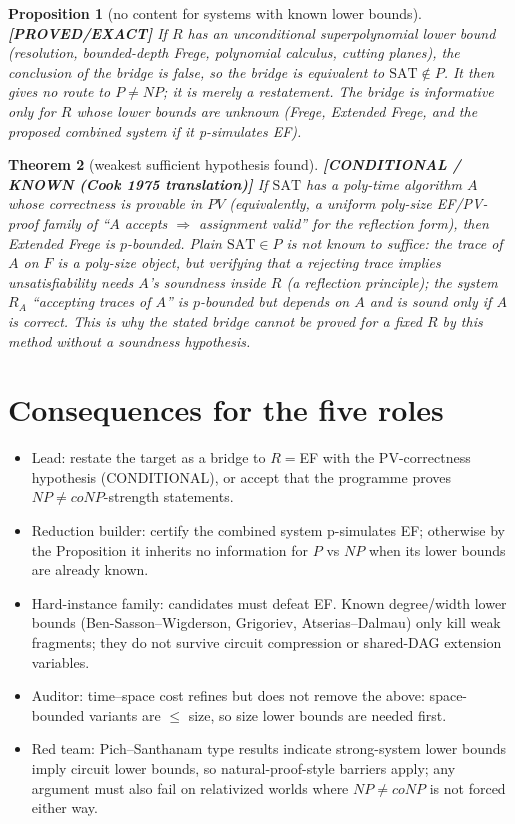 \documentclass[11pt]{article}
\newtheorem{theorem}{Theorem}
\newtheorem{proposition}[theorem]{Proposition}
\newcommand{\status}[1]{\textbf{[#1]}}
\newcommand{\SAT}{\mathrm{SAT}}
\begin{document}
\begin{proposition}[no content for systems with known lower bounds] \status{PROVED/EXACT}
If $R$ has an unconditional superpolynomial lower bound (resolution, bounded-depth Frege, polynomial calculus, cutting planes), the conclusion of the bridge is false, so the bridge is equivalent to $\SAT\notin P$. It then gives no route to $P\ne NP$; it is merely a restatement. The bridge is informative only for $R$ whose lower bounds are unknown (Frege, Extended Frege, and the proposed combined system if it p-simulates EF).
\end{proposition}

\begin{theorem}[weakest sufficient hypothesis found] \status{CONDITIONAL / KNOWN (Cook 1975 translation)}
If $\SAT$ has a poly-time algorithm $A$ whose correctness is provable in $PV$ (equivalently, a uniform poly-size EF/PV-proof family of ``$A$ accepts $\Rightarrow$ assignment valid'' for the reflection form), then Extended Frege is $p$-bounded. Plain $\SAT\in P$ is not known to suffice: the trace of $A$ on $F$ is a poly-size object, but verifying that a rejecting trace implies unsatisfiability needs $A$'s soundness inside $R$ (a reflection principle); the system $R_A$ ``accepting traces of $A$'' is $p$-bounded but depends on $A$ and is sound only if $A$ is correct. This is why the stated bridge cannot be proved for a \emph{fixed} $R$ by this method without a soundness hypothesis.
\end{theorem}

\section{Consequences for the five roles}
\begin{itemize}
\item Lead: restate the target as a bridge to $R=$EF with the PV-correctness hypothesis (CONDITIONAL), or accept that the programme proves $NP\ne coNP$-strength statements.
\item Reduction builder: certify the combined system p-simulates EF; otherwise by the Proposition it inherits no information for $P$ vs $NP$ when its lower bounds are already known.
\item Hard-instance family: candidates must defeat EF. Known degree/width lower bounds (Ben-Sasson--Wigderson, Grigoriev, Atserias--Dalmau) only kill weak fragments; they do not survive circuit compression or shared-DAG extension variables.
\item Auditor: time--space cost refines but does not remove the above: space-bounded variants are $\le$ size, so size lower bounds are needed first.
\item Red team: Pich--Santhanam type results indicate strong-system lower bounds imply circuit lower bounds, so natural-proof-style barriers apply; any argument must also fail on relativized worlds where $NP\ne coNP$ is not forced either way.
\end{itemize}
\end{document}
